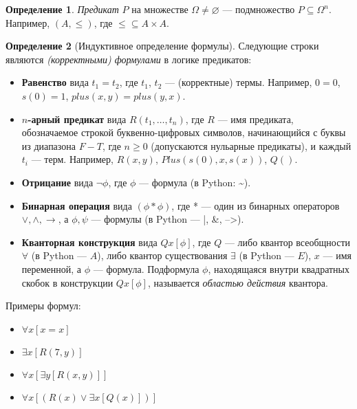 \documentclass[12pt]{article}
\let\im\rightarrow
\let\n\neg
\let\sus\subseteq
\let\x\times
\theoremstyle{definition}
\newtheorem{definition}{Определение}[section]
\theoremstyle{plain}
\theoremstyle{remark}
\begin{document}
\begin{definition}
  \textit{Предикат} $P$ на множестве $\Omega \neq \varnothing$ ---
  подмножество $P \sus \Omega^n$. Например, $(A, \leqslant)$, где
  $\leqslant \sus A \x A$.
\end{definition}

\begin{definition}[Индуктивное определение формулы]
  Следующие строки являются \textit{(корректными) формулами} в логике
  предикатов:
  \begin{itemize}
    \item \textbf{Равенство} вида $t_1 = t_2$, где $t_1$, $t_2$ ---
      (корректные) термы. Например, $0 = 0$, $s(0) = 1$, $plus(x, y)
      = plus(y, x)$.

    \item \textbf{$n$-арный предикат} вида $R(t_1, \dots, t_n)$, где
      $R$ --- имя предиката, обозначаемое строкой буквенно-цифровых
      символов, начинающийся с буквы из диапазона $F-T$, где $n
      \geqslant 0$ (допускаются нульарные предикаты), и каждый $t_i$
      --- терм. Например, $R(x, y)$, $Plus(s(0), x, s(x))$, $Q()$.

    \item \textbf{Отрицание} вида $\n \phi$, где $\phi$ --- формула
      (в Python: \~{}).

    \item \textbf{Бинарная операция} вида $(\phi * \phi)$, где * ---
      один из бинарных операторов $\lor, \land, \im$, а $\phi, \psi$
      --- формулы (в Python --- |, \&, -->).

    \item \textbf{Кванторная конструкция} вида $Qx[\phi]$, где $Q$
      --- либо квантор всеобщности $\forall$ (в Python --- $A$), либо
      квантор существования $\exists$ (в Python --- $E$), $x$ --- имя
      переменной, а $\phi$ --- формула. Подформула $\phi$,
      находящаяся внутри квадратных скобок в конструкции $Qx[\phi]$,
      называется \textit{областью действия} квантора.
  \end{itemize}

  Примеры формул:
  \begin{itemize}
    \item $\forall x [x = x]$

    \item $\exists x [R(7, y)]$

    \item $\forall x [\exists y [R(x, y)]]$

    \item $\forall x [(R(x) \lor \exists x [Q(x)])]$
  \end{itemize}
\end{definition}
\end{document}
